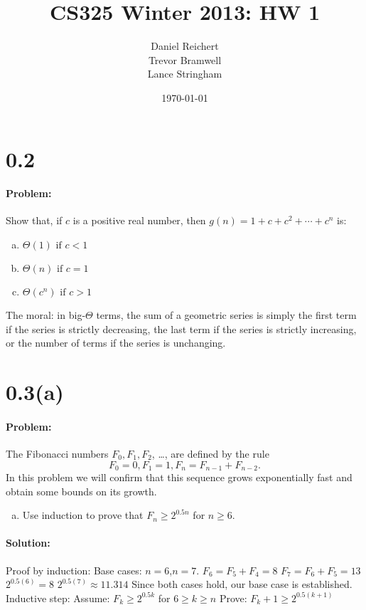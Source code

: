\documentclass[12pt]{article}
\title{CS325 Winter 2013: HW 1}
\author{
    Daniel Reichert \\
    Trevor Bramwell \\
    Lance Stringham
}
\date{\today}
\begin{document}
\maketitle

\section*{0.2}
\paragraph{Problem:}
Show that, if $c$ is a positive real number, then $g(n)=1+c+c^2+\cdots+c^n$ is:

\begin{enumerate}[(a)]
\item $\Theta(1) \text{ if } c < 1$
\item $\Theta(n) \text{ if } c = 1$
\item $\Theta(c^n) \text{ if } c > 1$
\end{enumerate}

The moral: in big-$\Theta$ terms, the sum of a geometric series is simply the
first term if the series is
strictly decreasing, the last term if the series is strictly increasing,
or the number of terms if the
series is unchanging.


\section*{0.3(a)}
\paragraph{Problem:}
The Fibonacci numbers $F_0, F_1, F_2$, \ldots, are defined by the rule
\[ F_0 = 0, F_1 = 1, F_n = F_{n - 1} + F_{n - 2}. \]
In this problem we will confirm that this sequence grows exponentially
fast and obtain some
bounds on its growth.

\begin{enumerate}[(a)]
\item Use induction to prove that $F_n \geq 2^{0.5n}$ for $n \geq 6$.
\end{enumerate}

\paragraph{Solution:}
Proof by induction:
	Base cases: $n=6$,$n=7$.
	$F_6 = F_5 + F_4 = 8$
	$F_7 = F_6 + F_5 = 13$
	$2^{0.5(6)} = 8$
	$2^{0.5(7)} \approx 11.314$
	Since both cases hold, our base case is established.
Inductive step:
	Assume: $F_k \geq 2^{0.5k}$ for $6 \geq k \geq n$
	Prove: $F_k+1 \geq 2^{0.5(k+1)}$
\end{document}
